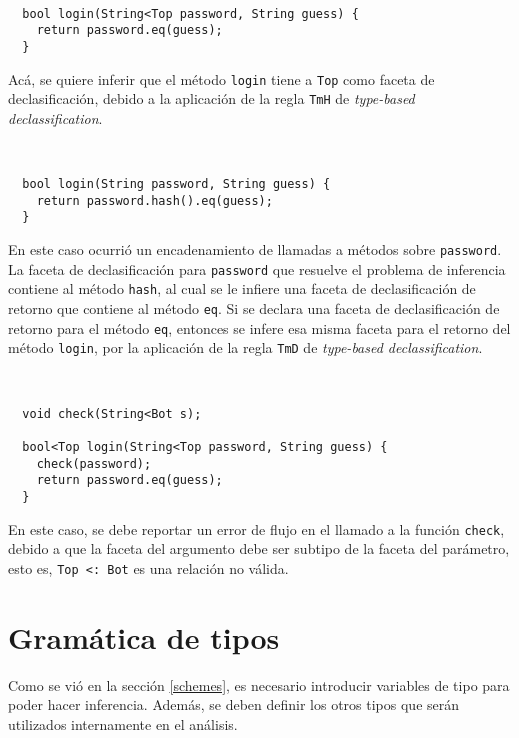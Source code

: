 \begin{ej} \ \\
  \normalfont
\begin{lstlisting}
  bool login(String<Top password, String guess) {
    return password.eq(guess);
  }
\end{lstlisting}
\end{ej}


Acá, se quiere inferir que el método \texttt{login} tiene a \texttt{Top} como faceta de declasificación, debido a la aplicación de la regla \texttt{TmH} de \textit{type-based declassification}.

\begin{ej} \ \\
  \normalfont
\begin{lstlisting}
  bool login(String password, String guess) {
    return password.hash().eq(guess);
  }
\end{lstlisting}
\end{ej}

En este caso ocurrió un encadenamiento de llamadas a métodos sobre \texttt{password}. La faceta de declasificación para \texttt{password} que resuelve el problema de inferencia contiene al método \texttt{hash}, al cual se le infiere una faceta de declasificación de retorno que contiene al método \texttt{eq}. Si se declara una faceta de declasificación de retorno para el método \texttt{eq}, entonces se infere esa misma faceta para el retorno del método \texttt{login}, por la aplicación de la regla \texttt{TmD} de \textit{type-based declassification}.

\begin{ej} \ \\
  \normalfont
\begin{lstlisting}
  void check(String<Bot s);

  bool<Top login(String<Top password, String guess) {
    check(password);
    return password.eq(guess);
  }
\end{lstlisting}
\end{ej}

En este caso, se debe reportar un error de flujo en el llamado a la función \texttt{check}, debido a que la faceta del argumento debe ser subtipo de la faceta del parámetro, esto es, \texttt{Top <: Bot} es una relación no válida.

\section{Gramática de tipos}
Como se vió en la sección \ref{schemes}, es necesario introducir variables de tipo para poder hacer inferencia. Además, se deben definir los otros tipos que serán utilizados internamente en el análisis.

